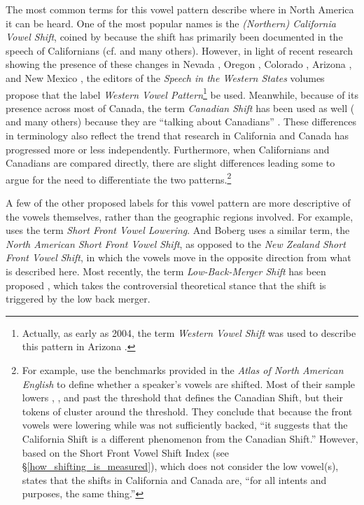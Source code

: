 The most common terms for this vowel pattern describe where in North America it can be heard. One of the most popular names is the \textit{(Northern) California Vowel Shift}, coined by \citet{eckert_2008} because the shift has primarily been documented in the speech of Californians (cf. \citealt{hall_lew_etal_2015, janoff_2018, podesva_2011, podesva_etal_2015, villarreal_2016_pads, villarreal_2018} and many others). However, in light of recent research showing the presence of these changes in Nevada \citep{fridland_kendall_2017_pads}, Oregon \citep{conn_2000_diss, nelson_2011, becker_etal_2016_pads, mclarty_etal_2016}, Colorado \citep{holland_brandenburg_2017_pads, holland_2019}, Arizona \citep{hall_lew_etal_2017}, and New Mexico \citep{brumbaugh_koops_2017_pads}, the editors of the \textit{Speech in the Western States} volumes \citep{fridland_etal_2016_pads, fridland_etal_2017_pads} propose that the label \textit{Western Vowel Pattern}\footnote{Actually, as early as 2004, the term \textit{Western Vowel Shift} was used to describe this pattern in Arizona \citep{hall_lew_2004}.} be used. Meanwhile, because of its presence across most of Canada, the term \textit{Canadian Shift} has been used as well  (\citealt{clarke_etal_1995, boberg_2005, sadlier_brown_tamminga_2008, roeder_jarmasz_2010, kettig_2014} and many others) because they are ``talking about Canadians'' \citep{li_etal_2018}. These differences in terminology also reflect the trend that research in California and Canada has progressed more or less independently. Furthermore, when Californians and Canadians are compared directly, there are slight differences \citep{kennedy_grama_2012, hagiwara_2006} leading some to argue for the need to differentiate the two patterns.\footnote{For example, \citet[49]{kennedy_grama_2012} use the benchmarks provided in the \textit{Atlas of North American English} to define whether a speaker’s vowels are shifted. Most of their sample lowers \kit, \dress, and \trap past the threshold that defines the Canadian Shift, but their tokens of \lot cluster around the threshold. They conclude that because the front vowels were lowering while \lot was not sufficiently backed, ``it suggests that the California Shift is a different phenomenon from the Canadian Shift.'' However, based on the Short Front Vowel Shift Index (see \S\ref{how_shifting_is_measured}), which does not consider the low vowel(s), \citet[21]{boberg_2019} states that the shifts in California and Canada are, ``for all intents and purposes, the same thing.''}

A few of the other proposed labels for this vowel pattern are more descriptive of the vowels themselves, rather than the geographic regions involved. For example, \citet{hickey_2018} uses the term \textit{Short Front Vowel Lowering}. And Boberg \citeyearpar{boberg_2019} uses a similar term, the \textit{North American Short Front Vowel Shift}, as opposed to the \textit{New Zealand Short Front Vowel Shift}, in which the vowels move in the opposite direction from what is described here. Most recently, the term \textit{Low-Back-Merger Shift} has been proposed \citep{becker_2019_pads}, which takes the controversial theoretical stance that the shift is triggered by the low back merger.

